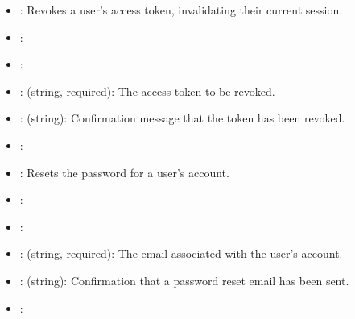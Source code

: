 \documentclass[letterpaper,10pt,english]{sphinxmanual}
\begin{document}
\sphinxAtStartPar
{}
\begin{itemize}
\item {} 
\sphinxAtStartPar
{}: Revokes a user’s access token, invalidating their current session.

\item {} 
\sphinxAtStartPar
{}: 

\item {} 
\sphinxAtStartPar
{}: 

\item {} 
\sphinxAtStartPar
{}:
\sphinxhyphen{}  (string, required): The access token to be revoked.

\item {} 
\sphinxAtStartPar
{}:
\sphinxhyphen{}  (string): Confirmation message that the token has been revoked.

\item {} 
\sphinxAtStartPar
{}: 

\end{itemize}

\sphinxAtStartPar
{}
\begin{itemize}
\item {} 
\sphinxAtStartPar
{}: Resets the password for a user’s account.

\item {} 
\sphinxAtStartPar
{}: 

\item {} 
\sphinxAtStartPar
{}: 

\item {} 
\sphinxAtStartPar
{}:
\sphinxhyphen{}  (string, required): The email associated with the user’s account.

\item {} 
\sphinxAtStartPar
{}:
\sphinxhyphen{}  (string): Confirmation that a password reset email has been sent.

\item {} 
\sphinxAtStartPar
{}: 

\end{itemize}
\end{document}
